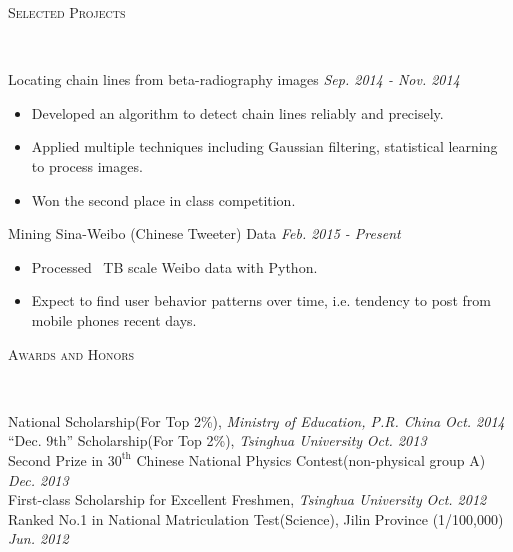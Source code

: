 \documentclass[9pt]{article}
\newenvironment{changemargin}[2]{%
  \begin{list}{}{%
    \setlength{\topsep}{0pt}%
    \setlength{\leftmargin}{#1}%
    \setlength{\rightmargin}{#2}%
    \setlength{\listparindent}{\parindent}%
    \setlength{\itemindent}{\parindent}%
    \setlength{\parsep}{\parskip}%
  }%
  \item[]}{\end{list}
}
\newcommand{\lineover}{
	\begin{changemargin}{-0.05in}{-0.05in}
		\vspace*{-8pt}
		\hrulefill \\
		\vspace*{-2pt}
	\end{changemargin}
}
\newcommand{\header}[1]{
	\begin{changemargin}{-0.5in}{-0.5in}
		\scshape{#1}\\
  	\lineover
	\end{changemargin}
}
\newenvironment{body} {
	\vspace*{-16pt}
	\begin{changemargin}{-0.25in}{-0.5in}
  }	
	{\end{changemargin}
}
\begin{document}
\header{Selected Projects}

\begin{body}
	\vspace{14pt}
	Locating chain lines from beta-radiography images \hfill \emph{Sep. 2014 - Nov. 2014}
	\begin{itemize}
	\itemsep 0pt
	\item Developed an algorithm to detect chain lines reliably and precisely. 
	\item Applied multiple techniques including Gaussian filtering, statistical learning to process images. 
	\item Won the second place in class competition. 
	\end{itemize}
	\smallskip
	Mining Sina-Weibo (Chinese Tweeter) Data \hfill \emph{Feb. 2015 - Present}
	\begin{itemize}
	\itemsep 0pt
	\item Processed ~TB scale Weibo data with Python. 
	\item Expect to find user behavior patterns over time, i.e. tendency to post from mobile phones recent days. 
	\end{itemize}
	\smallskip

\end{body}
\smallskip
\smallskip

\header{Awards and Honors}

\begin{body}
	\vspace{14pt}
	National Scholarship(For Top 2\%), \emph{Ministry of Education, P.R. China} \hfill{} \emph{Oct. 2014}\\
	\smallskip
	``Dec. 9th'' Scholarship(For Top 2\%), \emph{Tsinghua University} \hfill{} \emph{Oct. 2013}\\
	\smallskip
	Second Prize in $30^{\mathrm{th}}$ Chinese National Physics Contest(non-physical group A) \hfill{} \emph{Dec. 2013}\\
	\smallskip
	First-class Scholarship for Excellent Freshmen, \emph{Tsinghua University} \hfill{} \emph{Oct. 2012}\\
	\smallskip
	Ranked No.1 in National Matriculation Test(Science), Jilin Province (1/100,000) \hfill{} \emph{Jun. 2012}
\end{body}
\end{document}
